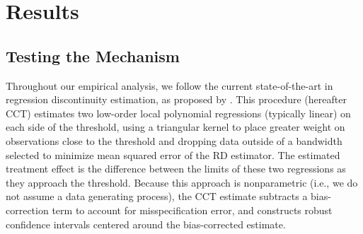 \documentclass[12pt]{article}
\begin{document}
\section{Results} \label{section:results}

\subsection{Testing the Mechanism}

Throughout our empirical analysis, we follow the current state-of-the-art in regression discontinuity estimation, as proposed by \citet{Calonico2014}. This procedure (hereafter CCT) estimates two low-order local polynomial regressions (typically linear) on each side of the threshold, using a triangular kernel to place greater weight on observations close to the threshold and dropping data outside of a bandwidth selected to minimize mean squared error of the RD estimator. The estimated treatment effect is the difference between the limits of these two regressions as they approach the threshold. Because this approach is nonparametric (i.e., we do not assume a data generating process), the CCT estimate subtracts a bias-correction term to account for misspecification error, and constructs robust confidence intervals centered around the bias-corrected estimate. 
\end{document}
